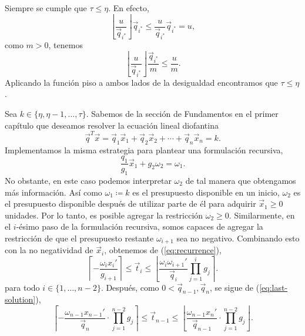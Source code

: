 \begin{observation}
	Siempre se cumple que $\tau \leq \eta$. En efecto,
	\begin{equation*}
		\left\lfloor \frac{u}{\vec{q}_{i^*}} \right\rfloor \vec{q}_{i^*}
		\leq \frac{u}{\vec{q}_{i^*}} \vec{q}_{i^*} = u,
	\end{equation*}
	como $m > 0$, tenemos
	\begin{equation*}
		\left\lfloor \frac{u}{\vec{q}_{i^*}} \right\rfloor \frac{\vec{q}_{i^*}}{m}
		\leq \frac{u}{m}.
	\end{equation*}
	Aplicando la función piso a ambos lados de la desigualdad encontramos que $\tau \leq \eta$.
\end{observation}
Sea $k \in \lbrace \eta, \eta - 1, \ldots, \tau \rbrace$. Sabemos de la sección de Fundamentos en el
primer capítulo que deseamos resolver la ecuación lineal diofantina
\begin{equation*}
	\vec{q}^T\vec{x} = \vec{q}_1\vec{x}_1 + \vec{q}_2\vec{x}_2 + \cdots + \vec{q}_n\vec{x}_n = k.
\end{equation*}
Implementamos la misma estrategia para plantear una formulación recursiva,
\begin{equation*}
	\frac{q_1}{g_1}\vec{x}_1 + g_2\omega_2 = \omega_1.
\end{equation*}
No obstante, en este caso podemos interpretar $\omega_2$ de tal manera que obtengamos más
información. Así como $\omega_1 \coloneq k$  es el presupuesto disponible en un inicio, $\omega_2$
es el presupuesto disponible después de utilizar parte de él para adquirir $\vec{x}_1 \geq 0$ unidades.
Por lo tanto, es posible agregar la restricción $\omega_2 \geq 0$. Similarmente, en el $i$-ésimo
paso de la formulación recursiva, somos capaces de agregar la restricción de que el presupuesto
restante $\omega_{i + 1}$ sea no negativo. Combinando esto con la no negatividad de $\vec{x}_i$, obtenemos
de (\ref{eq:recurrence}),
\begin{equation}
	\label{phase-1:finite:eq:param-bounds}
	\left\lceil -\frac{\omega_ix_i'}{g_{i+1}} \right\rceil
	\leq
	\vec{t}_i
	\leq
	\left\lfloor \frac{\omega_i\omega_{i+1}'}{\vec{q}_i} \prod_{j=1}^{i}g_j \right\rceil.
\end{equation}
para todo $i \in \lbrace 1, \ldots, n - 2\rbrace$. Después, como $0 < \vec{q}_{n - 1}, \vec{q}_n$, se sigue de
(\ref{eq:last-solution}),
\begin{equation}
	\label{phase-1:finite:eq:param-bounds-last}
	\left\lceil -\frac{\omega_{n-1}x_{n-1}'}{\vec{q}_n} \cdot \prod_{j=1}^{n-2}g_j \right\rceil
	\leq
	\vec{t}_{n - 1}
	\leq
	\left\lfloor \frac{\omega_{n-1}x_{n}'}{\vec{q}_{n-1}} \cdot \prod_{j=1}^{n-2}g_j \right\rfloor.
\end{equation}

